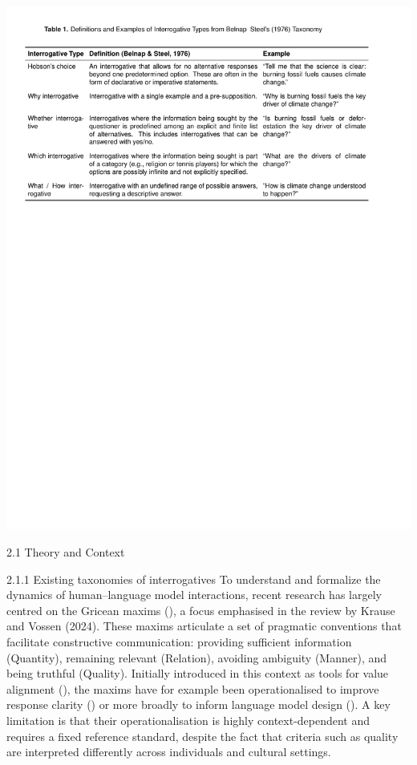 \documentclass[
  12pt,
]{article}
\begin{document}
\includegraphics{../03_outputs/01_taxonomies_of_interrogatives/table_1.pdf}

2.1 Theory and Context

2.1.1 Existing taxonomies of interrogatives
To understand and formalize the dynamics of human--language model interactions, recent research has largely centred on the Gricean maxims (), a focus emphasised in the review by Krause and Vossen (2024). These maxims articulate a set of pragmatic conventions that facilitate constructive communication: providing sufficient information (Quantity), remaining relevant (Relation), avoiding ambiguity (Manner), and being truthful (Quality). Initially introduced in this context as tools for value alignment (), the maxims have for example been operationalised to improve response clarity () or more broadly to inform language model design (). A key limitation is that their operationalisation is highly context-dependent and requires a fixed reference standard, despite the fact that criteria such as quality are interpreted differently across individuals and cultural settings.
\end{document}
